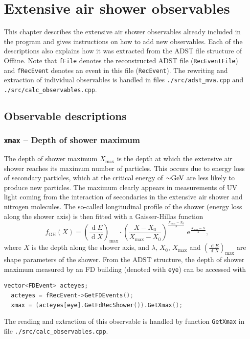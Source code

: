 \documentclass[12pt,a4paper]{report}
\newcommand{\diff}{\operatorname{d}\!}	%
\newcommand{\me}{\, \mathrm{e}}	%
\begin{document}
\chapter{Extensive air shower observables} \label{ch:observables}
{\noindent}This chapter describes the extensive air shower observables already included in the program and gives instructions on how to add new observables. Each of the descriptions also explains how it was extracted from the ADST file structure of Offline. Note that \texttt{fFile} denotes the reconstructed ADST file (\texttt{RecEventFile}) and \texttt{fRecEvent} denotes an event in this file (\texttt{RecEvent}). The rewriting and extraction of individual observables is handled in files \texttt{./src/adst\_mva.cpp} and \texttt{./src/calc\_observables.cpp}.

\section{Observable descriptions}

\subsection{\texttt{xmax} -- Depth of shower maximum}
The depth of shower maximum $X_{\textrm{max}}$ is the depth at which the extensive air shower reaches its maximum number of particles. This occurs due to energy loss of secondary particles, which at the critical energy of ${\sim}\unit[]{GeV}$ are less likely to produce new particles. The maximum clearly appears in measurements of UV light coming from the interaction of secondaries in the extensive air shower and nitrogen molecules. The so-called longitudinal profile of the shower (energy loss along the shower axis) is then fitted with a Gaisser-Hillas function
\begin{equation}\label{eq:gaisserHillas}
f_{\textrm{GH}}(X) = \left(\frac{\diff E}{\diff X}\right)_{\textrm{max}}\cdot \left(\frac{X - X_0}{X_{\textrm{max}} - X_0}\right)^{\frac{X_{\textrm{max}} - X_0}{\lambda}}\, \me^{\frac{X_{\textrm{max}} - X}{\lambda}},
\end{equation}
where $X$ is the depth along the shower axis, and $\lambda$, $X_0$, $X_{\textrm{max}}$ and $\left(\frac{\diff E}{\diff X}\right)_{\textrm{max}}$ are shape parameters of the shower. From the ADST structure, the depth of shower maximum measured by an FD building (denoted with \texttt{eye}) can be accessed with
\begin{lstlisting}[language=C++]
  vector<FDEvent> acteyes;
  acteyes = fRecEvent->GetFDEvents();
  xmax = (acteyes[eye].GetFdRecShower()).GetXmax();
\end{lstlisting}
The reading and extraction of this observable is handled by function \texttt{GetXmax} in file \texttt{./src/calc\_observables.cpp}.
\end{document}
